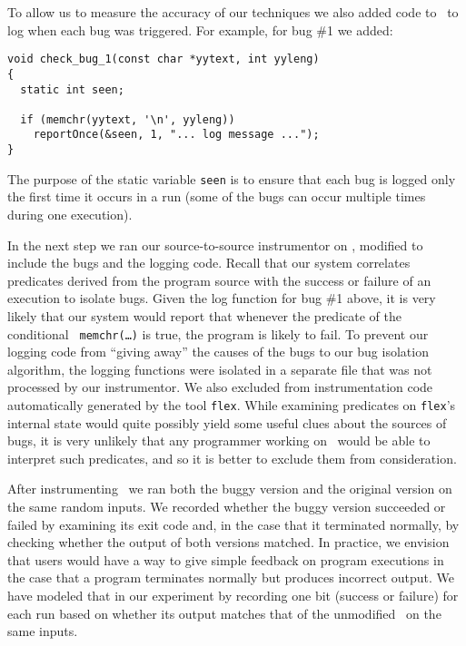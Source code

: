 To allow us to measure the accuracy of our techniques we also added code to \moss\ to 
log when each bug was triggered.  For example, for bug \#1 we added:
\begin{verbatim}
void check_bug_1(const char *yytext, int yyleng)
{
  static int seen;

  if (memchr(yytext, '\n', yyleng))
    reportOnce(&seen, 1, "... log message ...");
}
\end{verbatim}
The purpose of the static variable {\tt seen} is to ensure that each bug is logged only the first time
it occurs in a run (some of the bugs can occur multiple times during one execution).  

In the next step we ran our source-to-source instrumentor on \moss,
modified to include the bugs and the logging code.  Recall that our
system correlates predicates derived from the program source with the
success or failure of an execution to isolate bugs.  Given the log
function for bug \#1 above, it is very likely that our system would
report that whenever the predicate of the conditional {\tt
memchr(\ldots)} is true, the program is likely to fail.  To prevent
our logging code from ``giving away'' the causes of the bugs to our
bug isolation algorithm, the logging functions were isolated in a
separate file that was not processed by our instrumentor.  We also
excluded from instrumentation code automatically generated by the tool
{\tt flex}.  While examining predicates on {\tt flex}'s internal state
would quite possibly yield some useful clues about the sources of
bugs, it is very unlikely that any programmer working on \moss\ would
be able to interpret such predicates, and so it is better to exclude them from
consideration.

After instrumenting \moss\ we ran both the buggy version and the
original version on the same random inputs. We recorded whether the buggy
version succeeded or failed by examining its exit code and, in the
case that it terminated normally, by checking whether the output of
both versions matched.  In practice, we envision that users would have
a way to give simple feedback on program executions in the case that a
program terminates normally but produces incorrect output.  We have
modeled that in our experiment by recording one bit (success or
failure) for each run based on whether its output matches that of the
unmodified \moss\ on the same inputs.

